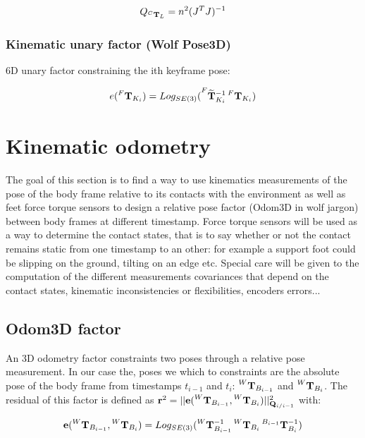 \documentclass[11pt]{article}
\newcommand{\T}[2]{\prescript{#1}{}{\bfT}_{#2}}
\newcommand{\Tm}[2]{\prescript{#1}{}{\widetilde{\bfT}}_{#2}}
\begin{document}
\begin{equation}
Q_{\T{C}{L}} = n^2(J^T J)^{-1}    
\end{equation}





\subsubsection*{Kinematic unary factor (Wolf Pose3D)}
6D unary factor constraining the ith keyframe pose:

\begin{equation*}
e(\T{F}{K_i}) = Log_{SE(3)}(\Tm{F}{K_i}^{-1} \T{F}{K_i})    
\end{equation*}



\section{Kinematic odometry}
The goal of this section is to find a way to use kinematics measurements of the pose of the body frame relative to its contacts with the environment as well as feet force torque sensors to design a relative pose factor (Odom3D in wolf jargon) between body frames at different timestamp. Force torque sensors will be used as a way to determine the contact states, that is to say whether or not the contact remains static from one timestamp to an other: for example a support foot could be slipping on the ground, tilting on an edge etc.
Special care will be given to the computation of the different measurements covariances that depend on the contact states, kinematic inconsistencies or flexibilities, encoders errors...

\subsection{Odom3D factor}
An 3D odometry factor constraints two poses through a relative pose measurement. In our case the, poses we which to constraints are the absolute pose of the body frame from timestamps $t_{i-1}$ and $t_{i}$: $\T{W}{B_{i-1}}$ and $\T{W}{B_i}$. The residual of this factor is defined as $\bfr^2 = ||\bfe(\T{W}{B_{i-1}}, \T{W}{B_i})||^2_{\bfQ_{i/i-1}}$
 with:
 
 \begin{equation*}
 \bfe(\T{W}{B_{i-1}}, \T{W}{B_i}) =  Log_{SE(3)}(
 \T{W}{B_{i-1}}^{-1}
 \T{W}{B_i}
 \T{B_{i-1}}{B_i}^{-1}
 )     
 \end{equation*} 
\end{document}
